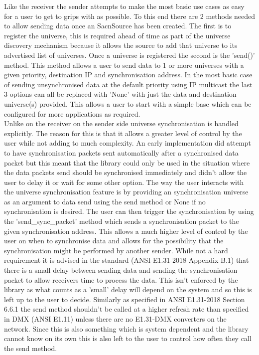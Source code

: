 \documentclass[11pt,a4paper]{article}
\begin{document}
Like the receiver the sender attempts to make the most basic use cases as easy for a user to get to grips with as possible. To this end there are 2 methods needed to allow sending data once an SacnSource has been created. The first is to register the universe, this is required ahead of time as part of the universe discovery mechanism because it allows the source to add that universe to its advertised list of universes. Once a universe is registered the second is the 'send()' method. This method allows a user to send data to 1 or more universes with a given priority, destination IP and synchronisation address. In the most basic case of sending unsynchronised data at the default priority using IP multicast the last 3 options can all be replaced with 'None' with just the data and destination universe(s) provided. This allows a user to start with a simple base which can be configured for more applications as required.\\

Unlike on the receiver on the sender side universe synchronisation is handled explicitly. The reason for this is that it allows a greater level of control by the user while not adding to much complexity. An early implementation did attempt to have synchronisation packets sent automatically after a synchronised data packet but this meant that the library could only be used in the situation where the data packets send should be synchronised immediately and didn't allow the user to delay it or wait for some other option. The way the user interacts with the universe synchronisation feature is by providing an synchronisation universe as an argument to data send using the send method or None if no synchronisation is desired. The user can then trigger the synchronisation by using the 'send\_sync\_packet' method which sends a synchronisation packet to the given synchronisation address. This allows a much higher level of control by the user on when to synchronise data and allows for the possibility that the synchronisation might be performed by another sender.  While not a hard requirement it is advised in the standard (ANSI-E1.31-2018 Appendix B.1) that there is a small delay between sending data and sending the synchronisation packet to allow receivers time to process the data. This isn't enforced by the library as what counts as a 'small' delay will depend on the system and so this is left up to the user to decide. Similarly as specified in ANSI E1.31-2018 Section 6.6.1 the send method shouldn't be called at a higher refresh rate than specified in DMX (ANSI E1.11) unless there are no E1.31-DMX converters on the network. Since this is also something which is system dependent and the library cannot know on its own this is also left to the user to control how often they call the send method.\\
\end{document}
